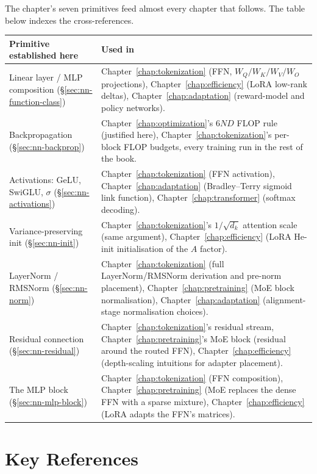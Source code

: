 The chapter's seven primitives feed almost every chapter that
follows. The table below indexes the cross-references.

\begin{center}
\small
\begin{tabular}{|p{4.2cm}|p{8.2cm}|}
\hline
\textbf{Primitive established here} & \textbf{Used in} \\
\hline
Linear layer / MLP composition (\S\ref{sec:nn-function-class}) &
  Chapter~\ref{chap:tokenization} (FFN, $W_Q/W_K/W_V/W_O$ projections), Chapter~\ref{chap:efficiency} (LoRA
  low-rank deltas), Chapter~\ref{chap:adaptation} (reward-model and policy networks). \\
Backpropagation (\S\ref{sec:nn-backprop}) &
  Chapter~\ref{chap:optimization}'s $6ND$ FLOP rule (justified here), Chapter~\ref{chap:tokenization}'s
  per-block FLOP budgets, every training run in the rest of the
  book. \\
Activations: GeLU, SwiGLU, $\sigma$
(\S\ref{sec:nn-activations}) &
  Chapter~\ref{chap:tokenization} (FFN activation), Chapter~\ref{chap:adaptation} (Bradley--Terry sigmoid
  link function), Chapter~\ref{chap:transformer} (softmax decoding). \\
Variance-preserving init (\S\ref{sec:nn-init}) &
  Chapter~\ref{chap:tokenization}'s $1/\sqrt{d_k}$ attention scale (same argument),
  Chapter~\ref{chap:efficiency} (LoRA He-init initialisation of the $A$ factor). \\
LayerNorm / RMSNorm (\S\ref{sec:nn-norm}) &
  Chapter~\ref{chap:tokenization} (full LayerNorm/RMSNorm derivation and pre-norm
  placement), Chapter~\ref{chap:pretraining} (MoE block normalisation), Chapter~\ref{chap:adaptation}
  (alignment-stage normalisation choices). \\
Residual connection (\S\ref{sec:nn-residual}) &
  Chapter~\ref{chap:tokenization}'s residual stream, Chapter~\ref{chap:pretraining}'s MoE block (residual
  around the routed FFN), Chapter~\ref{chap:efficiency} (depth-scaling intuitions
  for adapter placement). \\
The MLP block (\S\ref{sec:nn-mlp-block}) &
  Chapter~\ref{chap:tokenization} (FFN composition), Chapter~\ref{chap:pretraining} (MoE replaces the dense
  FFN with a sparse mixture), Chapter~\ref{chap:efficiency} (LoRA adapts the FFN's
  matrices). \\
\hline
\end{tabular}
\end{center}

\section{Key References}

